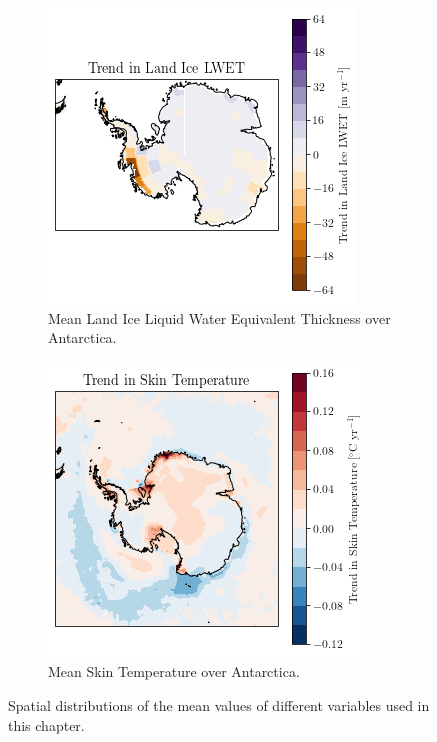 \documentclass[../main.tex]{subfiles}
\begin{document}
\begin{figure}[H]
\begin{subfigure}[h!]{0.49\textwidth}
\includegraphics[width=\textwidth]{images/week8/lres/trend_lic_distribution}
\caption{Mean Land Ice Liquid Water Equivalent Thickness over Antarctica.}
\end{subfigure}
\begin{subfigure}[h!]{0.49\textwidth}
\includegraphics[width=\textwidth]{images/week8/lres/trend_skt_distribution}
\caption{Mean Skin Temperature over Antarctica.}
\end{subfigure}
\caption{Spatial distributions of the mean values of different variables used in this chapter.}
\label{fig:trend_distributions}
\end{figure}
\end{document}
